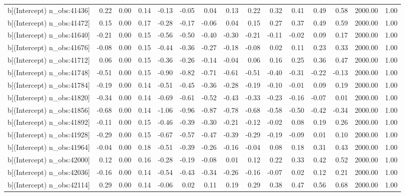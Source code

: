 \begin{table}[ht]
\begin{tabular}{rrrrrrrrrrrrrrr}
  b[(Intercept) n\_obs:41436] & 0.22 & 0.00 & 0.14 & -0.13 & -0.05 & 0.04 & 0.13 & 0.22 & 0.32 & 0.41 & 0.49 & 0.58 & 2000.00 & 1.00 \\ 
  b[(Intercept) n\_obs:41472] & 0.15 & 0.00 & 0.17 & -0.28 & -0.17 & -0.06 & 0.04 & 0.15 & 0.27 & 0.37 & 0.49 & 0.59 & 2000.00 & 1.00 \\ 
  b[(Intercept) n\_obs:41640] & -0.21 & 0.00 & 0.15 & -0.56 & -0.50 & -0.40 & -0.30 & -0.21 & -0.11 & -0.02 & 0.09 & 0.17 & 2000.00 & 1.00 \\ 
  b[(Intercept) n\_obs:41676] & -0.08 & 0.00 & 0.15 & -0.44 & -0.36 & -0.27 & -0.18 & -0.08 & 0.02 & 0.11 & 0.23 & 0.33 & 2000.00 & 1.00 \\ 
  b[(Intercept) n\_obs:41712] & 0.06 & 0.00 & 0.15 & -0.36 & -0.26 & -0.14 & -0.04 & 0.06 & 0.16 & 0.25 & 0.36 & 0.47 & 2000.00 & 1.00 \\ 
  b[(Intercept) n\_obs:41748] & -0.51 & 0.00 & 0.15 & -0.90 & -0.82 & -0.71 & -0.61 & -0.51 & -0.40 & -0.31 & -0.22 & -0.13 & 2000.00 & 1.00 \\ 
  b[(Intercept) n\_obs:41784] & -0.19 & 0.00 & 0.14 & -0.51 & -0.45 & -0.36 & -0.28 & -0.19 & -0.10 & -0.01 & 0.09 & 0.19 & 2000.00 & 1.00 \\ 
  b[(Intercept) n\_obs:41820] & -0.34 & 0.00 & 0.14 & -0.69 & -0.61 & -0.52 & -0.43 & -0.33 & -0.23 & -0.16 & -0.07 & 0.01 & 2000.00 & 1.00 \\ 
  b[(Intercept) n\_obs:41856] & -0.68 & 0.00 & 0.14 & -1.06 & -0.96 & -0.87 & -0.78 & -0.68 & -0.58 & -0.50 & -0.42 & -0.34 & 2000.00 & 1.00 \\ 
  b[(Intercept) n\_obs:41892] & -0.11 & 0.00 & 0.15 & -0.46 & -0.39 & -0.30 & -0.21 & -0.12 & -0.02 & 0.08 & 0.19 & 0.26 & 2000.00 & 1.00 \\ 
  b[(Intercept) n\_obs:41928] & -0.29 & 0.00 & 0.15 & -0.67 & -0.57 & -0.47 & -0.39 & -0.29 & -0.19 & -0.09 & 0.01 & 0.10 & 2000.00 & 1.00 \\ 
  b[(Intercept) n\_obs:41964] & -0.04 & 0.00 & 0.18 & -0.51 & -0.39 & -0.26 & -0.16 & -0.04 & 0.08 & 0.18 & 0.31 & 0.43 & 2000.00 & 1.00 \\ 
  b[(Intercept) n\_obs:42000] & 0.12 & 0.00 & 0.16 & -0.28 & -0.19 & -0.08 & 0.01 & 0.12 & 0.22 & 0.33 & 0.42 & 0.52 & 2000.00 & 1.00 \\ 
  b[(Intercept) n\_obs:42036] & -0.16 & 0.00 & 0.14 & -0.54 & -0.43 & -0.34 & -0.26 & -0.16 & -0.07 & 0.02 & 0.12 & 0.21 & 2000.00 & 1.00 \\ 
  b[(Intercept) n\_obs:42114] & 0.29 & 0.00 & 0.14 & -0.06 & 0.02 & 0.11 & 0.19 & 0.29 & 0.38 & 0.47 & 0.56 & 0.68 & 2000.00 & 1.00 \\ 

\end{tabular}
\end{table}
